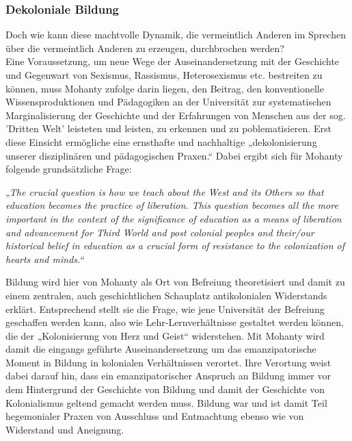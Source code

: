 \subsubsection{Dekoloniale Bildung}

\noindent  Doch wie kann diese machtvolle Dynamik, die vermeintlich Anderen im Sprechen
über die vermeintlich Anderen zu erzeugen, durchbrochen werden?\\
Eine
Voraussetzung, um neue Wege der Auseinandersetzung mit der Geschichte und
Gegenwart von Sexismus, Rassismus, Heterosexismus etc. bestreiten zu können,
muss Mohanty zufolge darin liegen, den Beitrag, den konventionelle
Wissensproduktionen und Pädagogiken an der Universität zur systematischen
Marginalisierung der Geschichte und der Erfahrungen von Menschen aus der sog.
'Dritten Welt' leisteten und leisten, zu erkennen und zu poblematisieren. Erst
diese Einsicht ermögliche eine ernsthafte und nachhaltige „dekolonisierung
unserer disziplinären und pädagogischen Praxen.“\footnotemark{} Dabei ergibt sich für Mohanty
folgende grundsätzliche Frage:
\begin{myenv}
  \textit{„The crucial question is how we teach about the West and its Others
    so that education becomes the practice of liberation. This question becomes
    all the more important in the context of the significance of education as a
    means of liberation and advancement for Third World and post colonial
    peoples and their/our historical belief in education as a crucial form of
    resistance to the colonization of hearts and minds.“\footnotemark
    }
\end{myenv}
Bildung wird hier von Mohanty als Ort von Befreiung theoretisiert und damit zu
einem zentralen, auch geschichtlichen Schauplatz antikolonialen Widerstands
erklärt. Entsprechend stellt sie die Frage, wie jene Universität der Befreiung
geschaffen werden kann, also wie Lehr-Lernverhältnisse gestaltet werden können,
die der „Kolonisierung von Herz und Geist“\footnotemark{} widerstehen.  Mit Mohanty wird
damit die eingangs geführte Auseinandersetzung um das emanzipatorische Moment
in Bildung in kolonialen Verhältnissen verortet. Ihre Verortung weist dabei
darauf hin, dass ein emanzipatorischer Anspruch an Bildung immer vor dem
Hintergrund der Geschichte von Bildung und damit der Geschichte von
Kolonialismus geltend gemacht werden muss. Bildung  war und ist damit Teil
hegemonialer Praxen von Ausschluss und Entmachtung ebenso wie von Widerstand
und Aneignung.\\


